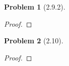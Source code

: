 \documentclass[10pt]{article}
\newcommand{\sk}{\vskip 10mm}
\theoremstyle{plain}
\newtheorem{problem}{Problem}
\theoremstyle{remark}
\begin{document}
\sk

\begin{problem}[2.9.2]
  
\end{problem}

\begin{proof}
  
\end{proof}

\sk

\begin{problem}[2.10]
  
\end{problem}

\begin{proof}
  
\end{proof}

\end{document}
